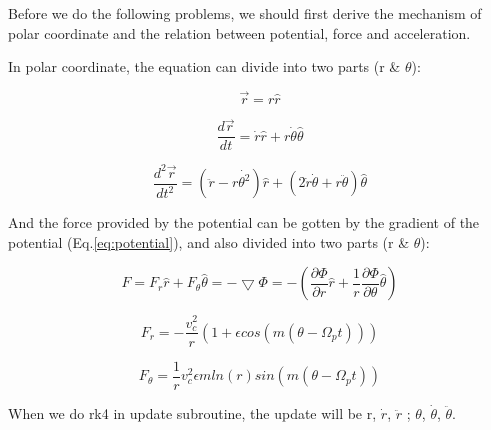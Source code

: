 \documentclass{article}
\begin{document}
Before we do the following problems, we should first derive the mechanism of polar coordinate and the relation between potential, force and acceleration.

In polar coordinate, the equation can divide into two parts (r \& $\theta$):

\begin{equation}
    \vec{r}=r\hat{r}
    \label{eq:r}
\end{equation}

\begin{equation}
    \frac{d\vec{r}}{dt}=\dot{r}\hat{r}+r\dot{\theta} \hat{\theta}
    \label{eq:vr}
\end{equation}

\begin{equation}
    \frac{d^2\vec{r}}{dt^2}=(\ddot{r}-r\dot{\theta^2})\hat{r}+(2\dot{r}\dot{\theta}+r\ddot{\theta})\hat{\theta}
    \label{eq:ar}
\end{equation}

And the force provided by the potential can be gotten by the gradient of the potential (Eq.\ref{eq:potential}), and also divided into two parts (r \& $\theta$):

\begin{equation}
    F=F_r\hat{r}+F_{\theta}\hat{\theta}
     =-\bigtriangledown \Phi
     =-(\frac{\partial \Phi}{\partial r}\hat{r}+\frac{1}{r}\frac{\partial \Phi}{\partial \theta}\hat{\theta})
     \label{eq:F}
\end{equation}

\begin{equation}
    F_r=-\frac{v_{c}^{2}}{r}(1+\epsilon cos(m(\theta -\Omega_{p}t)))
    \label{eq:Fr}
\end{equation}

\begin{equation}
    F_{\theta}=\frac{1}{r}v_{c}^{2}\epsilon mln(r)sin(m(\theta -\Omega_{p}t))
    \label{eq:Ft}
\end{equation}

When we do rk4 in update subroutine, the update will be r, $\dot{r}$, $\ddot{r}$ ; $\theta$, $\dot{\theta}$, $\ddot{\theta}$.
\end{document}
